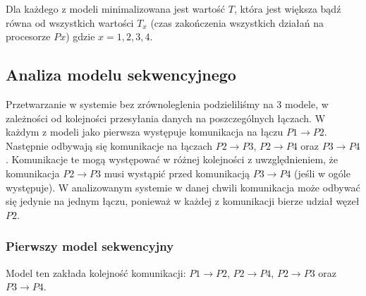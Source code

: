 Dla każdego z modeli minimalizowana jest wartość $T$, która jest większa bądź równa od wszystkich wartości $T_{x}$ (czas zakończenia wszystkich działań na procesorze $Px$) gdzie $x = 1, 2, 3, 4$.
 
\subsection{Analiza modelu sekwencyjnego}

Przetwarzanie w systemie bez zrównoleglenia podzieliliśmy na 3 modele, w zależności od kolejności przesyłania danych na poszczególnych łączach.
W każdym z modeli jako pierwsza występuje komunikacja na łączu $P1 \to P2$. Następnie odbywają się komunikacje na łączach $P2 \to P3$, $P2 \to P4$ oraz $P3 \to P4$.
Komunikacje te mogą występować w różnej kolejności z uwzględnieniem, że komunikacja $P2 \to P3$ musi wystąpić przed komunikacją $P3 \to P4$ (jeśli w ogóle występuje).
W analizowanym systemie w danej chwili komunikacja może odbywać się jedynie na jednym łączu, ponieważ w każdej z komunikacji bierze udział węzeł $P2$.

\subsubsection{Pierwszy model sekwencyjny}

Model ten zakłada kolejność komunikacji: $P1 \to P2$, $P2 \to P4$, $P2 \to P3$ oraz $P3 \to P4$. \\

